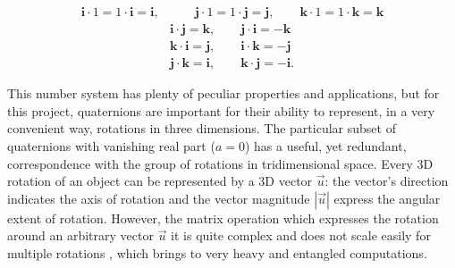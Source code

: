 \begin{align}
    \bm{i} \cdot 1 = 1 \cdot \bm{i} = \bm{i}, & \qquad  \bm{j} \cdot 1 = 1 \cdot \bm{j} = \bm{j}, \qquad \bm{k} \cdot 1 = 1 \cdot \bm{k} = \bm{k} \label{eq:Ham_prod}\\
    & \bm{i} \cdot \bm{j}= \bm{k}, \qquad \bm{j} \cdot \bm{i}= -\bm{k} \nonumber \\
    & \bm{k} \cdot \bm{i}= \bm{j}, \qquad \bm{i} \cdot \bm{k}= -\bm{j} \nonumber \\
    & \bm{j} \cdot \bm{k}= \bm{i}, \qquad \bm{k} \cdot \bm{j}= -\bm{i}. \nonumber
\end{align}

This number system has plenty of peculiar properties and applications, but for this project, quaternions are important for their ability to represent, in a very convenient way, rotations in three dimensions. The particular subset of quaternions with vanishing real part ($a=0$) has a useful, yet redundant, correspondence with the group of rotations in tridimensional space. Every 3D rotation of an object can be represented by a 3D vector $\vec u$: the vector's direction indicates the axis of rotation and the vector magnitude $|\vec u|$ express the angular extent of rotation. However, the matrix operation which expresses the rotation around an arbitrary vector $\vec u$ it is quite complex and does not scale easily for multiple rotations \cite{10.1007/BFb0031048}, which brings to very heavy and entangled computations.

